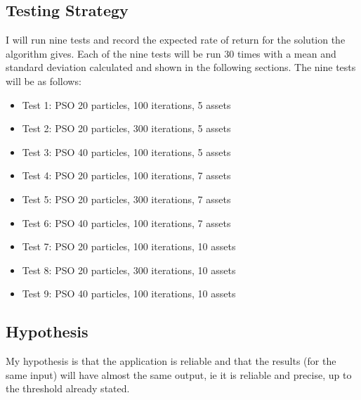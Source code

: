 \documentclass{pdfmx4020}
\begin{document}
    \subsection{Testing Strategy} %
    \label{sub:testing_strategy}
      I will run nine tests and record the expected rate of return for the solution the algorithm gives. Each of the nine tests will be run 30 times with a mean and standard deviation calculated and shown in the following sections. The nine tests will be as follows:
        \begin{itemize}
          \item Test 1: PSO 20 particles, 100 iterations, 5 assets
          \item Test 2: PSO 20 particles, 300 iterations, 5 assets
          \item Test 3: PSO 40 particles, 100 iterations, 5 assets
          \item Test 4: PSO 20 particles, 100 iterations, 7 assets
          \item Test 5: PSO 20 particles, 300 iterations, 7 assets
          \item Test 6: PSO 40 particles, 100 iterations, 7 assets
          \item Test 7: PSO 20 particles, 100 iterations, 10 assets
          \item Test 8: PSO 20 particles, 300 iterations, 10 assets
          \item Test 9: PSO 40 particles, 100 iterations, 10 assets
        \end{itemize}

    \subsection{Hypothesis} %
    \label{sub:hypothesis}
      My hypothesis is that the application is reliable and that the results (for the same input) will have almost the same output, ie it is reliable and precise, up to the threshold already stated. 
\end{document}
